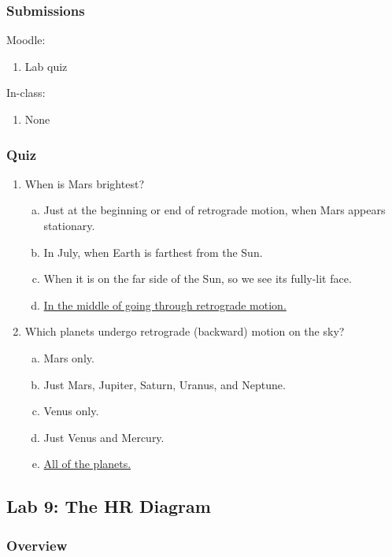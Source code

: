 \documentclass[12pt]{article}
\begin{document}
\subsubsection{Submissions}

Moodle:
\begin{enumerate}
\item Lab quiz
\end{enumerate}

\noindent
In-class:
\begin{enumerate}
\item None
\end{enumerate}


\subsubsection{Quiz}

\begin{enumerate}
\item
When is Mars brightest?
\begin{enumerate}[a.]
    \item Just at the beginning or end of retrograde motion, when Mars appears stationary.
    \item In July, when Earth is farthest from the Sun.
    \item When it is on the far side of the Sun, so we see its fully-lit face.
    \item \underline{In the middle of going through retrograde motion.}
\end{enumerate}
\item
Which planets undergo retrograde (backward) motion on the sky?
\begin{enumerate}[a.]
    \item Mars only.
    \item Just Mars, Jupiter, Saturn, Uranus, and Neptune.
    \item Venus only.
    \item Just Venus and Mercury.
    \item \underline{All of the planets.}
\end{enumerate}
\end{enumerate}


\newpage
\subsection{Lab 9: The HR Diagram}

\subsubsection{Overview}
\end{document}
